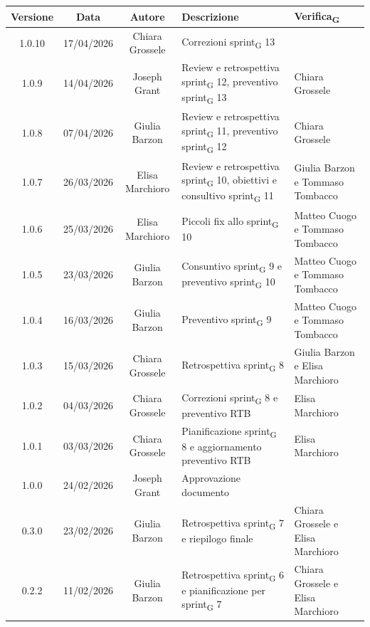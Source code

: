 \documentclass[11pt,a4paper]{article}
\newcommand{\gls}[1]{#1\textsubscript{G}}
\begin{document}
\begin{table}[H]
    \centering
    \begin{tabular}{|c|c|c|>{\raggedright\arraybackslash}p{}|p{}|}
        \hline
        \textbf{Versione} & \textbf{Data} & \textbf{Autore} & \textbf{Descrizione} & \textbf{\gls{Verifica}} \\
        \hline
        1.0.10 & 17/04/2026 & Chiara Grossele & Correzioni \gls{sprint} 13 &  \\
        \hline
        1.0.9 & 14/04/2026 & Joseph Grant & Review e retrospettiva \gls{sprint} 12, preventivo \gls{sprint} 13 & Chiara Grossele \\
        \hline
        1.0.8 & 07/04/2026 & Giulia Barzon & Review e retrospettiva \gls{sprint} 11, preventivo \gls{sprint} 12 & Chiara Grossele\\
        \hline
        1.0.7 & 26/03/2026 & Elisa Marchioro & Review e retrospettiva \gls{sprint} 10, obiettivi e consultivo \gls{sprint} 11 & Giulia Barzon e Tommaso Tombacco\\
        \hline
        1.0.6 & 25/03/2026 & Elisa Marchioro & Piccoli fix allo \gls{sprint} 10 & Matteo Cuogo e Tommaso Tombacco\\
        \hline
        1.0.5 & 23/03/2026 & Giulia Barzon & Consuntivo \gls{sprint} 9 e preventivo \gls{sprint} 10 & Matteo Cuogo e Tommaso Tombacco\\
        \hline
        1.0.4 & 16/03/2026 & Giulia Barzon & Preventivo \gls{sprint} 9 & Matteo Cuogo e Tommaso Tombacco\\
        \hline
        1.0.3 & 15/03/2026 & Chiara Grossele & Retrospettiva \gls{sprint} 8 & Giulia Barzon e Elisa Marchioro\\
        \hline
        1.0.2 & 04/03/2026 & Chiara Grossele & Correzioni \gls{sprint} 8 e preventivo RTB & Elisa Marchioro\\
        \hline
        1.0.1 & 03/03/2026 & Chiara Grossele & Pianificazione \gls{sprint} 8 e aggiornamento preventivo RTB & Elisa Marchioro\\
        \hline
        1.0.0 & 24/02/2026 & Joseph Grant & Approvazione documento & \\
        \hline
        0.3.0 & 23/02/2026 & Giulia Barzon & Retrospettiva \gls{sprint} 7 e riepilogo finale & Chiara Grossele e Elisa Marchioro\\
        \hline
        0.2.2 & 11/02/2026 & Giulia Barzon & Retrospettiva \gls{sprint} 6 e pianificazione per \gls{sprint} 7 & Chiara Grossele e Elisa Marchioro\\

\end{tabular}
\end{table}
\end{document}
